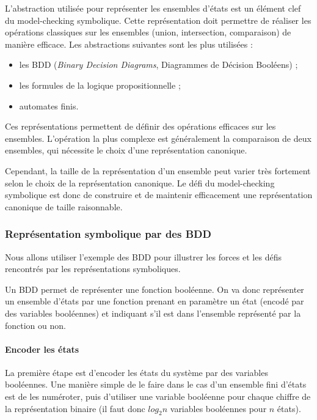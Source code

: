 L'abstraction utilisée pour représenter les ensembles d'états est un élément
clef du model-checking symbolique. Cette représentation doit permettre de
réaliser les opérations classiques sur les ensembles (union, intersection,
comparaison) de manière efficace. Les abstractions suivantes sont les plus
utilisées :

\begin{itemize}
\item
  les BDD (\emph{Binary Decision Diagrams}, Diagrammes de Décision Booléens) ;
\item
  les formules de la logique propositionnelle ;
\item
  automates finis.
\end{itemize}

Ces représentations permettent de définir des opérations efficaces sur les
ensembles. L'opération la plus complexe est généralement la comparaison de deux
ensembles, qui nécessite le choix d'une représentation canonique.

Cependant, la taille de la représentation d'un ensemble peut varier très
fortement selon le choix de la représentation canonique. Le défi du
model-checking symbolique est donc de construire et de maintenir efficacement
une représentation canonique de taille raisonnable.

\subsubsection{Représentation symbolique par des BDD}

Nous allons utiliser l'exemple des BDD pour illustrer les forces et les
défis rencontrés par les représentations symboliques.

Un BDD permet de représenter une fonction booléenne.
On va donc représenter un ensemble d'états par une fonction prenant
en paramètre un état (encodé par des variables booléennes) et indiquant s’il est dans l'ensemble représenté par la fonction ou non.

\paragraph{Encoder les états}
La première étape est d'encoder les états du système par des variables
booléennes. Une manière simple de le faire dans le cas d'un ensemble fini
d'états est de les numéroter, puis d'utiliser une variable booléenne pour chaque
chiffre de la représentation binaire (il faut donc \(log_2 n\) variables
booléennes pour \(n\) états).


